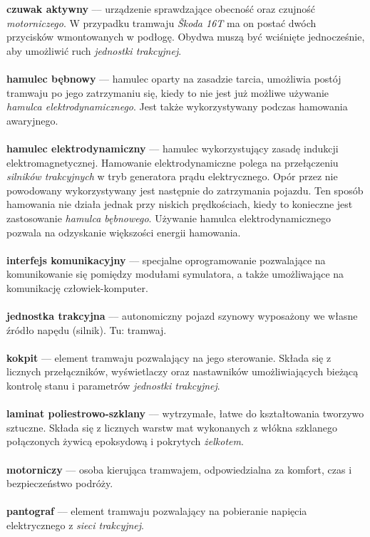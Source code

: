 \documentclass[12pt,a4paper]{article}
\begin{document}
{\bf czuwak aktywny} --– urządzenie sprawdzające obecność oraz czujność {\it motorniczego}. W
przypadku tramwaju {\it Škoda 16T} ma on postać dwóch przycisków wmontowanych w podłogę. Obydwa
muszą być wciśnięte jednocześnie, aby umożliwić ruch {\it jednostki trakcyjnej}.\\\\
{\bf hamulec bębnowy} --– hamulec oparty na zasadzie tarcia, umożliwia postój tramwaju po jego
zatrzymaniu się, kiedy to nie jest już możliwe używanie {\it hamulca elektrodynamicznego}. Jest
także wykorzystywany podczas hamowania awaryjnego.\\\\
{\bf hamulec elektrodynamiczny} --– hamulec wykorzystujący zasadę indukcji elektromagnetycznej.
Hamowanie elektrodynamiczne polega na przełączeniu {\it silników trakcyjnych} w tryb generatora
prądu elektrycznego. Opór przez nie powodowany wykorzystywany jest następnie do zatrzymania pojazdu.
Ten sposób hamowania nie działa jednak przy niskich prędkościach, kiedy to konieczne jest
zastosowanie {\it hamulca bębnowego}. Używanie hamulca elektrodynamicznego pozwala na odzyskanie
większości energii hamowania.\\\\
{\bf interfejs komunikacyjny} --– specjalne oprogramowanie pozwalające na komunikowanie się pomiędzy
modułami symulatora, a także umożliwające na komunikację człowiek-komputer.\\\\
{\bf jednostka trakcyjna} --– autonomiczny pojazd szynowy wyposażony we własne źródło napędu (silnik).
Tu: tramwaj.\\\\
{\bf kokpit} --– element tramwaju pozwalający na jego sterowanie. Składa się z licznych przełączników,
wyświetlaczy oraz nastawników umożliwiających bieżącą kontrolę stanu i parametrów {\it jednostki
trakcyjnej}.\\\\
{\bf laminat poliestrowo-szklany} --– wytrzymałe, łatwe do kształtowania tworzywo sztuczne. Składa się z licznych
warstw mat wykonanych z włókna szklanego połączonych żywicą epoksydową i pokrytych {\it
żelkotem}.\\\\
{\bf motorniczy} --– osoba kierująca tramwajem, odpowiedzialna za komfort, czas i bezpieczeństwo
podróży.\\\\
{\bf pantograf} --– element tramwaju pozwalający na pobieranie napięcia elektrycznego z {\it sieci 
trakcyjnej}.\\\\
\end{document}
